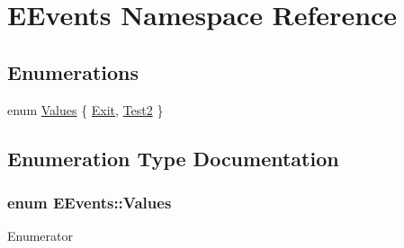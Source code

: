 \hypertarget{namespace_e_events}{\section{E\-Events Namespace Reference}
\label{namespace_e_events}
}
\subsection*{Enumerations}
\begin{DoxyCompactItemize}
\item 
enum \hyperlink{namespace_e_events_ad7951ce20842f9eeb617fae73d4c9504}{Values} \{ \hyperlink{namespace_e_events_ad7951ce20842f9eeb617fae73d4c9504a20233e366b9f50a1f82ff8da569d787d}{Exit}, 
\hyperlink{namespace_e_events_ad7951ce20842f9eeb617fae73d4c9504ae1a9c86642a36392472af0e7faa00d24}{Test2}
 \}
\end{DoxyCompactItemize}


\subsection{Enumeration Type Documentation}
\hypertarget{namespace_e_events_ad7951ce20842f9eeb617fae73d4c9504}{
\subsubsection[{Values}]{\setlength{\rightskip}{0pt plus 5cm}enum {\bf E\-Events\-::\-Values}}}\label{namespace_e_events_ad7951ce20842f9eeb617fae73d4c9504}
\begin{Desc}
\item[Enumerator]\par
\begin{description}
\item[{\em 
\hypertarget{namespace_e_events_ad7951ce20842f9eeb617fae73d4c9504a20233e366b9f50a1f82ff8da569d787d}{Exit}\label{namespace_e_events_ad7951ce20842f9eeb617fae73d4c9504a20233e366b9f50a1f82ff8da569d787d}
}]\item[{\em 
\hypertarget{namespace_e_events_ad7951ce20842f9eeb617fae73d4c9504ae1a9c86642a36392472af0e7faa00d24}{Test2}\label{namespace_e_events_ad7951ce20842f9eeb617fae73d4c9504ae1a9c86642a36392472af0e7faa00d24}
}]\end{description}
\end{Desc}
